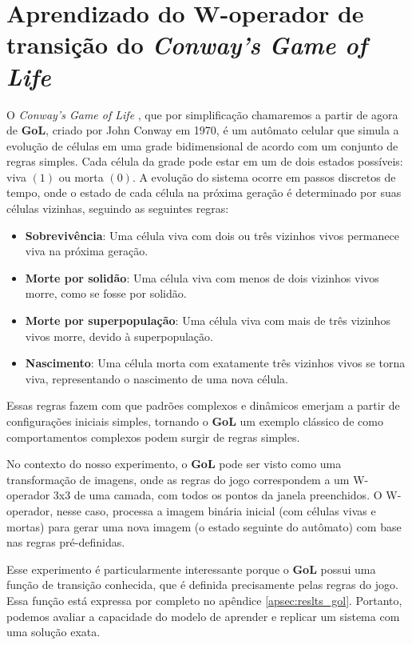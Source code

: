 \section{Aprendizado do W-operador de transição do \textit{Conway's Game of Life}}
\label{sec:GoL}

O \textit{Conway's Game of Life} \cite{GOL}, que por simplificação chamaremos a partir de agora de \textbf{GoL}, criado por John Conway em 1970, é um autômato celular que simula a evolução de células em uma grade bidimensional de acordo com um conjunto de regras simples. Cada célula da grade pode estar em um de dois estados possíveis: viva $(1)$ ou morta $(0)$. A evolução do sistema ocorre em passos discretos de tempo, onde o estado de cada célula na próxima geração é determinado por suas células vizinhas, seguindo as seguintes regras:

\begin{itemize}
    \item \textbf{Sobrevivência}: Uma célula viva com dois ou três vizinhos vivos permanece viva na próxima geração.
    \item \textbf{Morte por solidão}: Uma célula viva com menos de dois vizinhos vivos morre, como se fosse por solidão.
    \item \textbf{Morte por superpopulação}: Uma célula viva com mais de três vizinhos vivos morre, devido à superpopulação.
    \item \textbf{Nascimento}: Uma célula morta com exatamente três vizinhos vivos se torna viva, representando o nascimento de uma nova célula.
\end{itemize}

Essas regras fazem com que padrões complexos e dinâmicos emerjam a partir de configurações iniciais simples, tornando o \textbf{GoL} um exemplo clássico de como comportamentos complexos podem surgir de regras simples.

No contexto do nosso experimento, o \textbf{GoL} pode ser visto como uma transformação de imagens, onde as regras do jogo correspondem a um W-operador 3x3 de uma camada, com todos os pontos da janela preenchidos. O W-operador, nesse caso, processa a imagem binária inicial (com células vivas e mortas) para gerar uma nova imagem (o estado seguinte do autômato) com base nas regras pré-definidas.

Esse experimento é particularmente interessante porque o \textbf{GoL} possui uma função de transição conhecida, que é definida precisamente pelas regras do jogo. Essa função está expressa por completo no apêndice \ref{apsec:reslts_gol}. Portanto, podemos avaliar a capacidade do modelo de aprender e replicar um sistema com uma solução exata.

